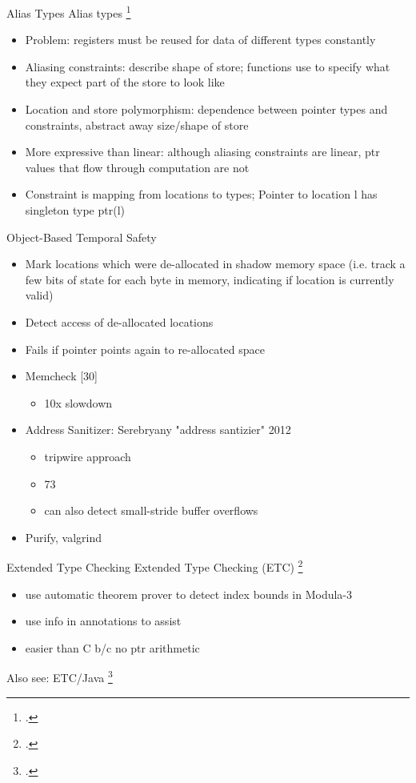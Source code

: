 \documentclass[aspectratio=169]{beamer}
\begin{document}
\begin{frame}{Alias Types}
  Alias types \footcite{smith_alias_2000}
    \begin{itemize}
        \item Problem: registers must be reused for data of different types constantly
        \item Aliasing constraints: describe shape of store; functions use to specify what they expect part of the store to look like
        \item Location and store polymorphism: dependence between pointer types and constraints, abstract away size/shape of store
        \item More expressive than linear: although aliasing constraints are linear, ptr values that flow through computation are not
        \item Constraint is mapping from locations to types; Pointer to location l has singleton type ptr(l)
    \end{itemize}
\end{frame}

\begin{frame}{Object-Based Temporal Safety}
\begin{itemize}
\item Mark locations which were de-allocated in shadow memory space (i.e. track a few bits of state for each byte in memory, indicating if location is currently valid)
\item Detect access of de-allocated locations
\item Fails if pointer points again to re-allocated space
\item Memcheck [30] 
    \begin{itemize}
      \item 10x slowdown
    \end{itemize}
\item Address Sanitizer: Serebryany "address santizier" 2012
    \begin{itemize}
        \item tripwire approach
        \item 73%
        \item can also detect small-stride buffer overflows
    \end{itemize}
\item Purify, valgrind
\end{itemize}
\end{frame}

\begin{frame}[fragile]{Extended Type Checking}
Extended Type Checking (ETC) \footcite{detlefs_overview_1995}
    \begin{itemize}
      \item use automatic theorem prover to detect index bounds in Modula-3
      \item use info in annotations to assist
      \item easier than C b/c no ptr arithmetic
    \end{itemize}
Also see: ETC/Java \footcite{flanagan_extended_2002}
\end{frame}
\end{document}
